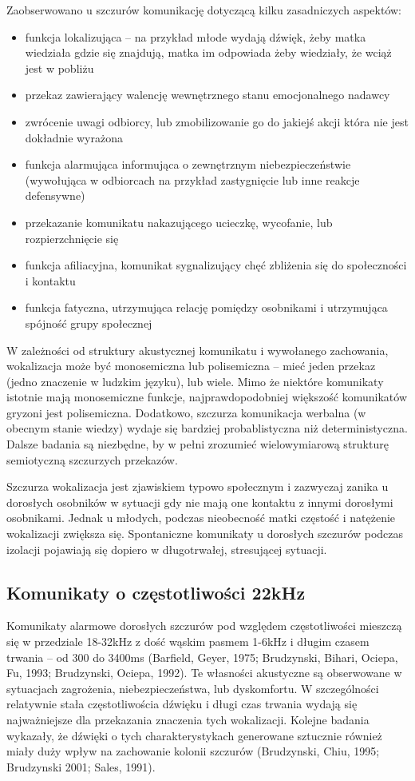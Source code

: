 \documentclass{psychol}
\begin{document}
Zaobserwowano u szczurów komunikację dotyczącą kilku zasadniczych aspektów:
\begin{itemize}
    \item funkcja lokalizująca -- na przykład młode wydają dźwięk, żeby matka wiedziała gdzie się znajdują, matka im odpowiada żeby wiedziały, że wciąż jest w pobliżu
    \item przekaz zawierający walencję wewnętrznego stanu emocjonalnego nadawcy
    \item zwrócenie uwagi odbiorcy, lub zmobilizowanie go do jakiejś akcji która nie jest dokładnie wyrażona
    \item funkcja alarmująca informująca o zewnętrznym niebezpieczeństwie (wywołująca w odbiorcach na przykład zastygnięcie lub inne reakcje defensywne)
    \item przekazanie komunikatu nakazującego ucieczkę, wycofanie, lub rozpierzchnięcie się
    \item funkcja afiliacyjna, komunikat sygnalizujący chęć zbliżenia się do społeczności i kontaktu
    \item funkcja fatyczna, utrzymująca relację pomiędzy osobnikami i utrzymująca spójność grupy społecznej
\end{itemize}

W zależności od struktury akustycznej komunikatu i wywołanego zachowania, wokalizacja może być monosemiczna lub polisemiczna -- mieć jeden przekaz (jedno znaczenie w ludzkim języku), lub wiele. Mimo że niektóre komunikaty istotnie mają monosemiczne funkcje, najprawdopodobniej większość komunikatów gryzoni jest polisemiczna. Dodatkowo, szczurza komunikacja werbalna (w obecnym stanie wiedzy) wydaje się bardziej probablistyczna niż deterministyczna. Dalsze badania są niezbędne, by w pełni zrozumieć wielowymiarową strukturę semiotyczną szczurzych przekazów.

Szczurza wokalizacja jest zjawiskiem typowo społecznym i zazwyczaj zanika u dorosłych osobników w sytuacji gdy nie mają one kontaktu z innymi dorosłymi osobnikami. Jednak u młodych, podczas nieobecność matki częstość i natężenie wokalizacji zwiększa się. Spontaniczne komunikaty u dorosłych szczurów podczas izolacji pojawiają się dopiero w długotrwałej, stresującej sytuacji.

\subsection{Komunikaty o częstotliwości 22kHz}

Komunikaty alarmowe dorosłych szczurów pod względem częstotliwości mieszczą się w przedziale 18-32kHz z dość wąskim pasmem 1-6kHz i długim czasem trwania -- od 300 do 3400ms (Barfield, Geyer, 1975; Brudzynski, Bihari, Ociepa, Fu, 1993; Brudzynski, Ociepa, 1992). Te własności akustyczne są obserwowane w sytuacjach zagrożenia, niebezpieczeństwa, lub dyskomfortu. W szczególności relatywnie stała częstotliwościa dźwięku i długi czas trwania wydają się najważniejsze dla przekazania znaczenia tych wokalizacji. Kolejne badania wykazały, że dźwięki o tych charakterystykach generowane sztucznie również miały duży wpływ na zachowanie kolonii szczurów (Brudzynski, Chiu, 1995; Brudzynski 2001; Sales, 1991).
\end{document}
